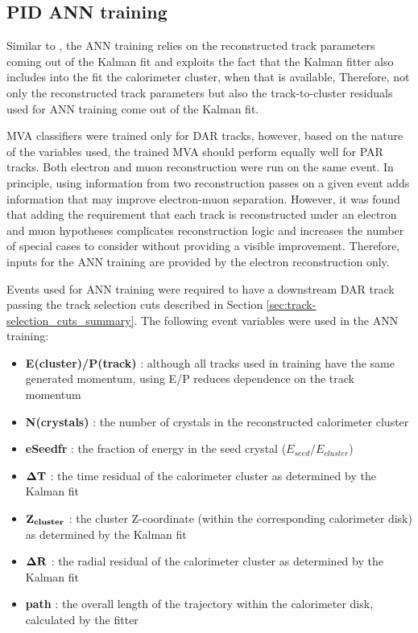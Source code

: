 \subsection {PID ANN training }
\label{sec:mumem_pid_ann_training}

Similar to \cite{MU2E_26664_PID}, the ANN training relies on the reconstructed 
track parameters coming out of the Kalman fit and exploits the fact that the Kalman
fitter also includes into the fit the calorimeter cluster, when that is available,
Therefore, not only the reconstructed track parameters but also the track-to-cluster
residuals used for ANN training come out of the Kalman fit. 

MVA classifiers were trained only for DAR tracks, however, based on the nature of 
the variables used, the trained MVA should perform equally well for PAR tracks.
%
Both electron and muon reconstruction were run on the same event. 
In principle, using information from two reconstruction passes on a given event adds
information that may improve electron-muon separation.
However, it was found that adding  the requirement that each track is reconstructed under
an electron and muon hypotheses complicates reconstruction logic and increases
the number of special cases to consider without providing a visible improvement. 
Therefore, inputs for the ANN training are provided by the electron reconstruction only.

Events used for ANN training were required to have a downstream DAR track passing
the track selection cuts described in Section \ref{sec:track-selection_cuts_summary}.
%
The following event variables were used in the ANN training:

\begin{itemize}
\item 
  {\bf E(cluster)/P(track)} : although all tracks used in training have the same generated momentum,
  using E/P reduces dependence on the track momentum 
\item 
  {\bf N(crystals)} : the number of crystals in the reconstructed calorimeter cluster
\item 
  {\bf eSeedfr} : the fraction of energy in the seed crystal ($E_{seed}/E_{cluster}$)
\item 
  {$\bf \Delta T$} : the time residual of the calorimeter cluster as determined by the Kalman fit
\item 
  {$\bf Z_{cluster}$} : the cluster Z-coordinate (within the corresponding calorimeter disk) as determined by the Kalman fit
\item 
  {$\bf \Delta R$} : the radial residual of the calorimeter cluster as determined by the Kalman fit
\item 
  {\bf path} : the overall length of the trajectory within the calorimeter disk, calculated by the fitter
\end{itemize}

